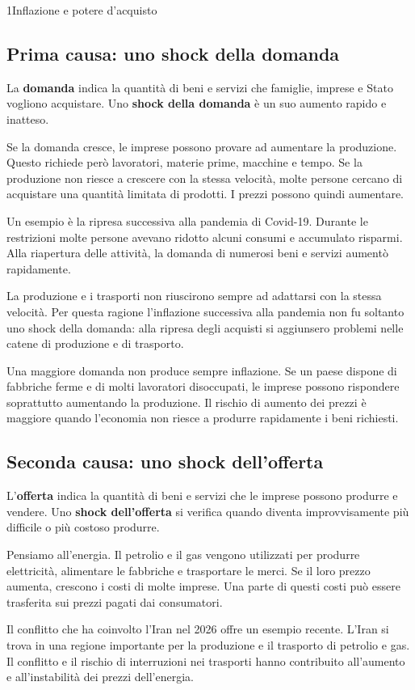 \begin{lettura}{1}{Inflazione e potere d’acquisto}
\subsection*{Prima causa: uno shock della domanda}
La \textbf{domanda} indica la quantità di beni e servizi che famiglie, imprese e Stato vogliono acquistare. Uno \textbf{shock della domanda} è un suo aumento rapido e inatteso.

Se la domanda cresce, le imprese possono provare ad aumentare la produzione. Questo richiede però lavoratori, materie prime, macchine e tempo. Se la produzione non riesce a crescere con la stessa velocità, molte persone cercano di acquistare una quantità limitata di prodotti. I prezzi possono quindi aumentare.

Un esempio è la ripresa successiva alla pandemia di Covid-19. Durante le restrizioni molte persone avevano ridotto alcuni consumi e accumulato risparmi. Alla riapertura delle attività, la domanda di numerosi beni e servizi aumentò rapidamente.

La produzione e i trasporti non riuscirono sempre ad adattarsi con la stessa velocità. Per questa ragione l'inflazione successiva alla pandemia non fu soltanto uno shock della domanda: alla ripresa degli acquisti si aggiunsero problemi nelle catene di produzione e di trasporto.

Una maggiore domanda non produce sempre inflazione. Se un paese dispone di fabbriche ferme e di molti lavoratori disoccupati, le imprese possono rispondere soprattutto aumentando la produzione. Il rischio di aumento dei prezzi è maggiore quando l'economia non riesce a produrre rapidamente i beni richiesti.

\subsection*{Seconda causa: uno shock dell'offerta}
L'\textbf{offerta} indica la quantità di beni e servizi che le imprese possono produrre e vendere. Uno \textbf{shock dell'offerta} si verifica quando diventa improvvisamente più difficile o più costoso produrre.

Pensiamo all'energia. Il petrolio e il gas vengono utilizzati per produrre elettricità, alimentare le fabbriche e trasportare le merci. Se il loro prezzo aumenta, crescono i costi di molte imprese. Una parte di questi costi può essere trasferita sui prezzi pagati dai consumatori.

Il conflitto che ha coinvolto l'Iran nel 2026 offre un esempio recente. L'Iran si trova in una regione importante per la produzione e il trasporto di petrolio e gas. Il conflitto e il rischio di interruzioni nei trasporti hanno contribuito all'aumento e all'instabilità dei prezzi dell'energia.


\end{lettura}
